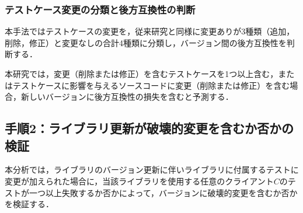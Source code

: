 \documentclass[submit]{ipsj}
\begin{document}
\subsubsection{テストケース変更の分類と後方互換性の判断}
\label{sec:step1-2}

本手法ではテストケースの変更を，従来研究\cite{foo}と同様に変更ありが3種類（追加，削除，修正）と変更なしの合計4種類に分類し，バージョン間の後方互換性を判断する．



本研究では，変更（削除または修正）を含むテストケースを1つ以上含む，またはテストケースに影響を与えるソースコードに変更（削除または修正）を含む場合，新しいバージョンに後方互換性の損失を含むと予測する．

\subsection{手順2：ライブラリ更新が破壊的変更を含むか否かの検証}
\label{sec:step2}

本分析では，ライブラリのバージョン更新に伴いライブラリに付属するテストに変更が加えられた場合に，当該ライブラリを使用する任意のクライアント$C$のテストが一つ以上失敗するか否かによって，バージョンに破壊的変更を含むか否かを検証する．
\end{document}
